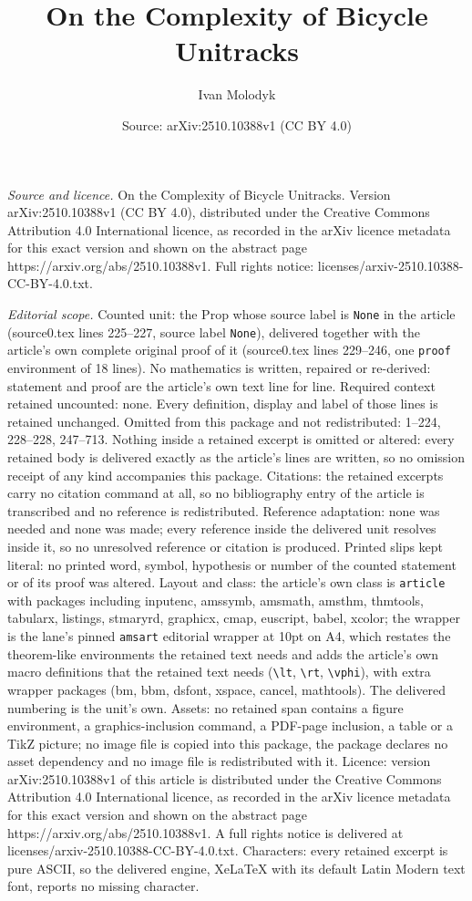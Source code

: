 \documentclass[10pt,a4paper]{amsart}
\title[On the Complexity of Bicycle Unitracks]{On the Complexity of Bicycle Unitracks}
\author{Ivan Molodyk}
\date{Source: arXiv:2510.10388v1 (CC BY 4.0)}
\begin{document}
\maketitle

\noindent\emph{Source and licence.} On the Complexity of Bicycle Unitracks. Version arXiv:2510.10388v1 (CC BY 4.0), distributed under the Creative Commons Attribution 4.0 International licence, as recorded in the arXiv licence metadata for this exact version and shown on the abstract page https://arxiv.org/abs/2510.10388v1. Full rights notice: licenses/arxiv-2510.10388-CC-BY-4.0.txt.\par\smallskip

\noindent\textit{Editorial scope.} Counted unit: the Prop whose source label is \texttt{None} in the article (source0.tex lines 225--227, source label \texttt{None}), delivered together with the article's own complete original proof of it (source0.tex lines 229--246, one \texttt{proof} environment of 18 lines). No mathematics is written, repaired or re-derived: statement and proof are the article's own text line for line. Required context retained uncounted: none. Every definition, display and label of those lines is retained unchanged. Omitted from this package and not redistributed: 1--224, 228--228, 247--713. Nothing inside a retained excerpt is omitted or altered: every retained body is delivered exactly as the article's lines are written, so no omission receipt of any kind accompanies this package. Citations: the retained excerpts carry no citation command at all, so no bibliography entry of the article is transcribed and no reference is redistributed. Reference adaptation: none was needed and none was made; every reference inside the delivered unit resolves inside it, so no unresolved reference or citation is produced. Printed slips kept literal: no printed word, symbol, hypothesis or number of the counted statement or of its proof was altered. Layout and class: the article's own class is \texttt{article} with packages including inputenc, amssymb, amsmath, amsthm, thmtools, tabularx, listings, stmaryrd, graphicx, cmap, euscript, babel, xcolor; the wrapper is the lane's pinned \texttt{amsart} editorial wrapper at 10pt on A4, which restates the theorem-like environments the retained text needs and adds the article's own macro definitions that the retained text needs (\texttt{\textbackslash lt}, \texttt{\textbackslash rt}, \texttt{\textbackslash vphi}), with extra wrapper packages (bm, bbm, dsfont, xspace, cancel, mathtools). The delivered numbering is the unit's own. Assets: no retained span contains a figure environment, a graphics-inclusion command, a PDF-page inclusion, a table or a TikZ picture; no image file is copied into this package, the package declares no asset dependency and no image file is redistributed with it. Licence: version arXiv:2510.10388v1 of this article is distributed under the Creative Commons Attribution 4.0 International licence, as recorded in the arXiv licence metadata for this exact version and shown on the abstract page https://arxiv.org/abs/2510.10388v1. A full rights notice is delivered at licenses/arxiv-2510.10388-CC-BY-4.0.txt. Characters: every retained excerpt is pure ASCII, so the delivered engine, XeLaTeX with its default Latin Modern text font, reports no missing character.
\end{document}
